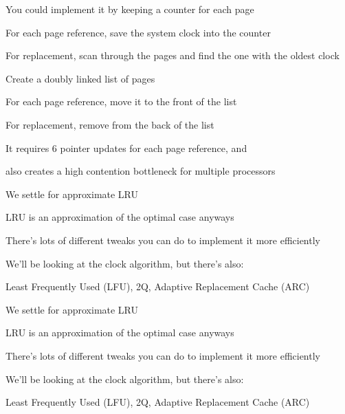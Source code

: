\begin{slide}


    You could implement it by keeping a counter for each page
    \medskip

    For each page reference, save the system clock into the counter
    \medskip


    For replacement, scan through the pages and find the one with the oldest clock

\end{slide}

\begin{slide}


    Create a doubly linked list of pages
    \medskip

    For each page reference, move it to the front of the list
    \medskip

    For replacement, remove from the back of the list
    \medskip

    It requires 6 pointer updates for each page reference, and

    \leftspace{}also creates a high contention bottleneck for multiple processors

\end{slide}

\begin{slide}


    We settle for approximate LRU

    \leftspace{}LRU is an approximation of the optimal case anyways
    \medskip

    There's lots of different tweaks you can do to implement it more efficiently
    \medskip

    We'll be looking at the clock algorithm, but there's also:

    \leftspace{}Least Frequently Used (LFU), 2Q, Adaptive Replacement Cache (ARC)

\end{slide}

\begin{slide}


    We settle for approximate LRU

    \leftspace{}LRU is an approximation of the optimal case anyways
    \medskip

    There's lots of different tweaks you can do to implement it more efficiently
    \medskip

    We'll be looking at the clock algorithm, but there's also:

    \leftspace{}Least Frequently Used (LFU), 2Q, Adaptive Replacement Cache (ARC)

\end{slide}

